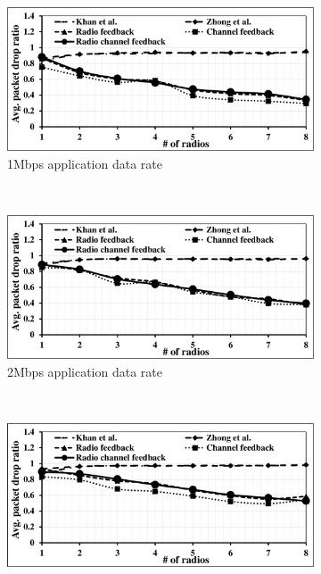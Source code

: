 \begin{landscape}
\begin{figure}[!htbp]
    \centering
    \begin{subfigure}[t]{0.625\textwidth}
        \includegraphics[width=\textwidth]{alltopology/36PacketDropRatio24d1}
        \caption{1Mbps application data rate}
    \end{subfigure}
    ~
    \begin{subfigure}[t]{0.625\textwidth}
        \includegraphics[width=\textwidth]{alltopology/36PacketDropRatio24d2}
        \caption{2Mbps application data rate}
    \end{subfigure}
    ~\\
    \begin{subfigure}[t]{0.625\textwidth}
        \includegraphics[width=\textwidth]{alltopology/36PacketDropRatio24d4}

\end{subfigure}
\end{figure}
\end{landscape}
